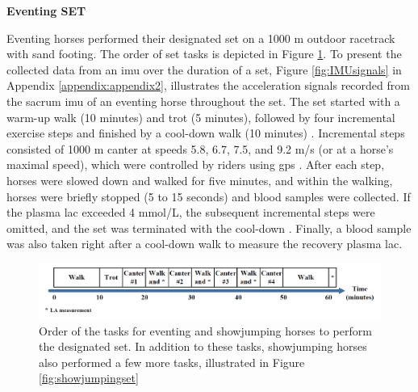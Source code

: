 \vspace{10pt}
{\noindent\textbf{Eventing SET} \par}
Eventing horses performed their designated \gls{set} on a 1000 m outdoor racetrack with sand footing. The order of \gls{set} tasks is depicted in Figure \ref{fig:eventingset}. To present the collected data from an \gls{imu} over the duration of a \gls{set}, Figure \ref{fig:IMUsignals} in Appendix \ref{appendix:appendix2}, illustrates the acceleration signals recorded from the sacrum \gls{imu} of an eventing horse throughout the \gls{set}. The \gls{set} started with a warm-up walk (10 minutes) and trot (5 minutes), followed by four incremental exercise steps and finished by a cool-down walk (10 minutes) \cite{CBM}. Incremental steps consisted of 1000 m canter at speeds 5.8, 6.7, 7.5, and 9.2 m/s (or at a horse’s maximal speed), which were controlled by riders using \gls{gps} \cite{munsters_2014_exercise}. After each step, horses were slowed down and walked for five minutes, and within the walking, horses were briefly stopped (5 to 15 seconds) and blood samples were collected. If the plasma \gls{lac} exceeded 4 \gls{mmol/L}, the subsequent incremental steps were omitted, and the \gls{set} was terminated with the cool-down \cite{MUNSTERS2013193}. Finally, a blood sample was also taken right after a cool-down walk to measure the recovery plasma \gls{lac}.

\begin{figure}[!htbp]
\centering
\includegraphics[scale=0.27]{chapters/data/figures/EventingSET.png}
\caption{Order of the tasks for eventing and showjumping horses to perform the designated \gls{set}. In addition to these tasks, showjumping horses also performed a few more tasks, illustrated in Figure \ref{fig:showjumpingset}}
\label{fig:eventingset}
\end{figure}

